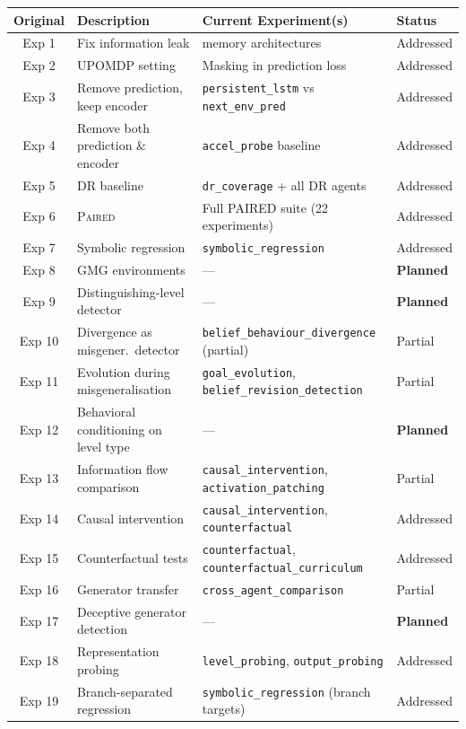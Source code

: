 \documentclass[11pt,a4paper]{article}
\theoremstyle{remark}
\newcommand{\paired}{\textsc{Paired}}
\begin{document}
\begin{longtable}{c >{\raggedright\arraybackslash}p{4cm} >{\raggedright\arraybackslash}p{5.5cm} l}
\toprule
\textbf{Original} & \textbf{Description} & \textbf{Current Experiment(s)} & \textbf{Status} \\
\midrule
\endhead
Exp 1 & Fix information leak & 5 memory architectures & Addressed \\
Exp 2 & UPOMDP setting & Masking in prediction loss & Addressed \\
Exp 3 & Remove prediction, keep encoder & \texttt{persistent\_lstm} vs \texttt{next\_env\_pred} & Addressed \\
Exp 4 & Remove both prediction \& encoder & \texttt{accel\_probe} baseline & Addressed \\
Exp 5 & DR baseline & \texttt{dr\_coverage} + all DR agents & Addressed \\
Exp 6 & \paired{} & Full PAIRED suite (22 experiments) & Addressed \\
Exp 7 & Symbolic regression & \texttt{symbolic\_regression} & Addressed \\
Exp 8 & GMG environments & --- & \textbf{Planned} \\
Exp 9 & Distinguishing-level detector & --- & \textbf{Planned} \\
Exp 10 & Divergence as misgener.\ detector & \texttt{belief\_behaviour\_divergence} (partial) & Partial \\
Exp 11 & Evolution during misgeneralisation & \texttt{goal\_evolution}, \texttt{belief\_revision\_detection} & Partial \\
Exp 12 & Behavioral conditioning on level type & --- & \textbf{Planned} \\
Exp 13 & Information flow comparison & \texttt{causal\_intervention}, \texttt{activation\_patching} & Partial \\
Exp 14 & Causal intervention & \texttt{causal\_intervention}, \texttt{counterfactual} & Addressed \\
Exp 15 & Counterfactual tests & \texttt{counterfactual}, \texttt{counterfactual\_curriculum} & Addressed \\
Exp 16 & Generator transfer & \texttt{cross\_agent\_comparison} & Partial \\
Exp 17 & Deceptive generator detection & --- & \textbf{Planned} \\
Exp 18 & Representation probing & \texttt{level\_probing}, \texttt{output\_probing} & Addressed \\
Exp 19 & Branch-separated regression & \texttt{symbolic\_regression} (branch targets) & Addressed \\

\end{longtable}
\end{document}
